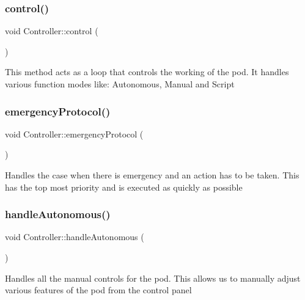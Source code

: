 \subsubsection{\texorpdfstring{control()}{control()}}
{\footnotesize\ttfamily void Controller\+::control (\begin{DoxyParamCaption}{ }\end{DoxyParamCaption})}

This method acts as a loop that controls the working of the pod. It handles various function modes like\+: Autonomous, Manual and Script \mbox{\label{class_controller_a290be619c2e973b2d1c78d50c8125df5}} 
\subsubsection{\texorpdfstring{emergency\+Protocol()}{emergencyProtocol()}}
{\footnotesize\ttfamily void Controller\+::emergency\+Protocol (\begin{DoxyParamCaption}{ }\end{DoxyParamCaption})\hspace{0.3cm}{\ttfamily [private]}}

Handles the case when there is emergency and an action has to be taken. This has the top most priority and is executed as quickly as possible \mbox{\label{class_controller_a11dc901b92d8dc082cf9a5e6a0617c4a}} 
\subsubsection{\texorpdfstring{handle\+Autonomous()}{handleAutonomous()}}
{\footnotesize\ttfamily void Controller\+::handle\+Autonomous (\begin{DoxyParamCaption}{ }\end{DoxyParamCaption})\hspace{0.3cm}{\ttfamily [private]}}

Handles all the manual controls for the pod. This allows us to manually adjust various features of the pod from the control panel \mbox{\label{class_controller_af1fbb94f21eb0601126b14349fa49294}} 
